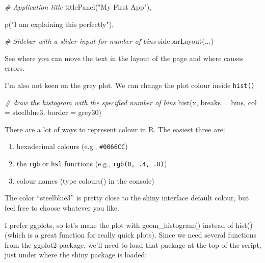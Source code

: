 \documentclass[
]{book}
\newenvironment{Shaded}{\begin{snugshade}}{\end{snugshade}}
\newcommand{\AttributeTok}[1]{\textcolor[rgb]{0.77,0.63,0.00}{#1}}
\newcommand{\CommentTok}[1]{\textcolor[rgb]{0.56,0.35,0.01}{\textit{#1}}}
\newcommand{\FunctionTok}[1]{\textcolor[rgb]{0.00,0.00,0.00}{#1}}
\newcommand{\NormalTok}[1]{#1}
\newcommand{\StringTok}[1]{\textcolor[rgb]{0.31,0.60,0.02}{#1}}
\providecommand{\tightlist}{%
  \setlength{\itemsep}{0pt}\setlength{\parskip}{0pt}}
\begin{document}
\begin{Shaded}
\begin{Highlighting}[]
   \CommentTok{\# Application title}
   \FunctionTok{titlePanel}\NormalTok{(}\StringTok{"My First App"}\NormalTok{),}

   \FunctionTok{p}\NormalTok{(}\StringTok{"I am explaining this perfectly"}\NormalTok{),}

   \CommentTok{\# Sidebar with a slider input for number of bins}
   \FunctionTok{sidebarLayout}\NormalTok{(...)}
\end{Highlighting}
\end{Shaded}

See where you can move the text in the layout of the page and where causes errors.

I'm also not keen on the grey plot. We can change the plot colour inside \texttt{hist()}

\begin{Shaded}
\begin{Highlighting}[]
      \CommentTok{\# draw the histogram with the specified number of bins}
      \FunctionTok{hist}\NormalTok{(x, }\AttributeTok{breaks =}\NormalTok{ bins, }\AttributeTok{col =} \StringTok{\textquotesingle{}steelblue3\textquotesingle{}}\NormalTok{, }\AttributeTok{border =} \StringTok{\textquotesingle{}grey30\textquotesingle{}}\NormalTok{)}
\end{Highlighting}
\end{Shaded}

There are a lot of ways to represent colour in R. The easiest three are:

\begin{enumerate}
\def\labelenumi{\arabic{enumi}.}
\tightlist
\item
  hexadecimal colours (e.g., \texttt{\#0066CC})
\item
  the \texttt{rgb} or \texttt{hsl} functions (e.g., \texttt{rgb(0,\ .4,\ .8)})
\item
  colour names (type colours() in the console)
\end{enumerate}

The color ``steelblue3'' is pretty close to the shiny interface default colour, but feel free to choose whatever you like.

I prefer ggplots, so let's make the plot with geom\_histogram() instead of hist() (which is a great function for really quick plots). Since we need several functions from the ggplot2 package, we'll need to load that package at the top of the script, just under where the shiny package is loaded:
\end{document}
